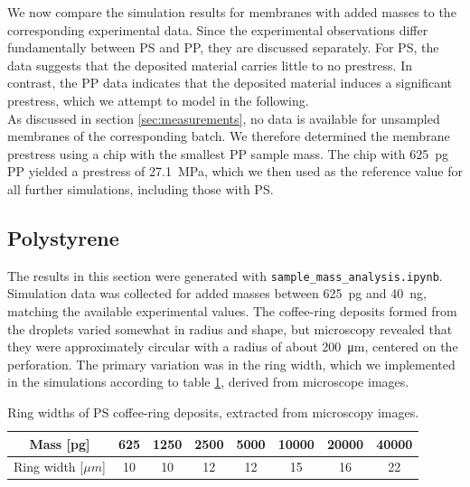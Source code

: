 We now compare the simulation results for membranes with added masses to the corresponding experimental data. Since the experimental observations differ fundamentally between PS and PP, they are discussed separately. For PS, the data suggests that the deposited material carries little to no prestress. In contrast, the PP data indicates that the deposited material induces a significant prestress, which we attempt to model in the following.\\
As discussed in section \ref{sec:measurements}, no data is available for unsampled membranes of the corresponding batch. We therefore determined the membrane prestress using a chip with the smallest PP sample mass. The chip with \SI{625}{\pico\gram} PP yielded a prestress of \SI{27.1}{\mega\pascal}, which we then used as the reference value for all further simulations, including those with PS.\\

\subsection{Polystyrene}
\label{sec:polystyrene}

The results in this section were generated with \texttt{sample\_mass\_analysis.ipynb}. Simulation data was collected for added masses between \SI{625}{\pico\gram} and \SI{40}{\nano\gram}, matching the available experimental values. The coffee-ring deposits formed from the droplets varied somewhat in radius and shape, but microscopy revealed that they were approximately circular with a radius of about \SI{200}{\micro\meter}, centered on the perforation. The primary variation was in the ring width, which we implemented in the simulations according to table \ref{tab:coffee_ring_widths}, derived from microscope images.\\

\begin{table}[h]
    \centering
    \begin{tabular}{|c|c|c|c|c|c|c|c|}
        \hline
        Mass [pg] & 625 & 1250 & 2500 & 5000 & 10000 & 20000 & 40000 \\
        \hline
        Ring width [$\mu m$] & 10 & 10 & 12 & 12 & 15 & 16 & 22 \\
        \hline
    \end{tabular}
    \caption{Ring widths of PS coffee-ring deposits, extracted from microscopy images.}
    \label{tab:coffee_ring_widths}
\end{table}

